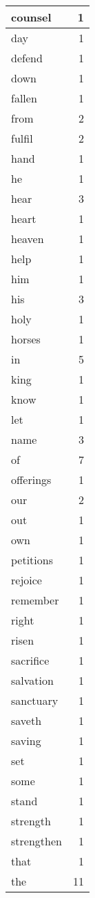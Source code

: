 \begin{center}
\begin{longtable}{l|r}
counsel & 1\\ \hline 
day & 1\\ \hline 
defend & 1\\ \hline 
down & 1\\ \hline 
fallen & 1\\ \hline 
from & 2\\ \hline 
fulfil & 2\\ \hline 
hand & 1\\ \hline 
he & 1\\ \hline 
hear & 3\\ \hline 
heart & 1\\ \hline 
heaven & 1\\ \hline 
help & 1\\ \hline 
him & 1\\ \hline 
his & 3\\ \hline 
holy & 1\\ \hline 
horses & 1\\ \hline 
in & 5\\ \hline 
king & 1\\ \hline 
know & 1\\ \hline 
let & 1\\ \hline 
name & 3\\ \hline 
of & 7\\ \hline 
offerings & 1\\ \hline 
our & 2\\ \hline 
out & 1\\ \hline 
own & 1\\ \hline 
petitions & 1\\ \hline 
rejoice & 1\\ \hline 
remember & 1\\ \hline 
right & 1\\ \hline 
risen & 1\\ \hline 
sacrifice & 1\\ \hline 
salvation & 1\\ \hline 
sanctuary & 1\\ \hline 
saveth & 1\\ \hline 
saving & 1\\ \hline 
set & 1\\ \hline 
some & 1\\ \hline 
stand & 1\\ \hline 
strength & 1\\ \hline 
strengthen & 1\\ \hline 
that & 1\\ \hline 
the & 11\\ \hline 

\end{longtable}
\end{center}
